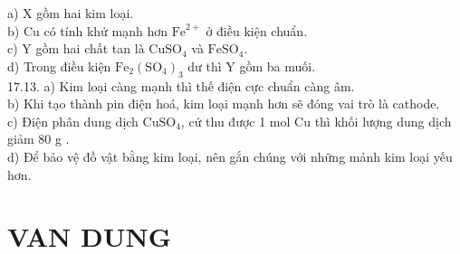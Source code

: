 \documentclass[10pt]{article}
\begin{document}
a) X gồm hai kim loại.\\
b) Cu có tính khử mạnh hơn $\mathrm{Fe}^{2+}$ ở điều kiện chuẩn.\\
c) Y gồm hai chất tan là $\mathrm{CuSO}_{4}$ và $\mathrm{FeSO}_{4}$.\\
d) Trong điều kiện $\mathrm{Fe}_{2}\left(\mathrm{SO}_{4}\right)_{3}$ dư thì Y gồm ba muối.\\
17.13. a) Kim loại càng mạnh thì thế điện cực chuẩn càng âm.\\
b) Khi tạo thành pin điện hoá, kim loại mạnh hơn sẽ đóng vai trò là cathode.\\
c) Điện phân dung dịch $\mathrm{CuSO}_{4}$, cứ thu được 1 mol Cu thì khối lượng dung dịch giảm 80 g .\\
d) Để bảo vệ đồ vật bằng kim loại, nên gắn chúng với những mảnh kim loại yếu hơn.

\section*{VAN DUNG}
\end{document}
